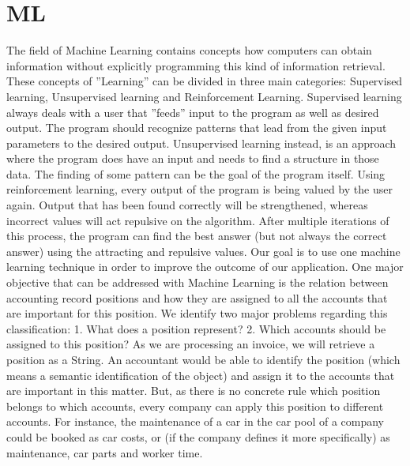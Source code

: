 %
% 

\chapter{ML}
\label{Machine Learning}


The field of Machine Learning contains concepts how computers can obtain information without explicitly programming this kind of information retrieval. These concepts of ''Learning'' can be divided in three main categories: Supervised learning, Unsupervised learning and Reinforcement Learning.
Supervised learning always deals with a user that ''feeds'' input to the program as well as desired output. The program should recognize patterns that lead from the given input parameters to the desired output.
Unsupervised learning instead, is an approach where the program does have an input and needs to find a structure in those data. The finding of some pattern can be the goal of the program itself.
Using reinforcement learning, every output of the program is being valued by the user again. Output that has been found correctly will be strengthened, whereas incorrect values will act repulsive on the algorithm. After multiple iterations of this process, the program can find the best answer (but not always the correct answer) using the attracting and repulsive values.
Our goal is to use one machine learning technique in order to improve the outcome of our application. One major objective that can be addressed with Machine Learning is the relation between accounting record positions and how they are assigned to all the accounts that are important for this position.
We identify two major problems regarding this classification:
1.	What does a position represent?
2.	Which accounts should be assigned to this position?
As we are processing an invoice, we will retrieve a position as a String. An accountant would be able to identify the position (which means a semantic identification of the object) and assign it to the accounts that are important in this matter. But, as there is no concrete rule which position belongs to which accounts, every company can apply this position to different accounts. 
For instance, the maintenance of a car in the car pool of a company could be booked as car costs, or (if the company defines it more specifically) as maintenance, car parts and worker time.
